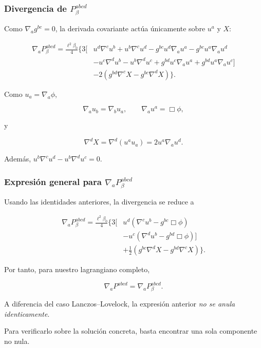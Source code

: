 \documentclass{beamer}
\begin{document}
\begin{frame}[label=nav-frame-117]
	\frametitle{Divergencia de $P_\beta^{abcd}$}
	\small

	Como \(\nabla_a g^{bc}=0\), la derivada covariante actúa únicamente
	sobre \(u^a\) y \(X\):

	\begin{align*}
		\nabla_aP_\beta^{abcd}
		=
		\frac{\ell^2\beta_0}{4}
		\Bigg\{
		3\Big[
		&
		u^d\nabla^c u^b
		+u^b\nabla^c u^d
		-g^{bc}u^d\nabla_a u^a
		-g^{bc}u^a\nabla_a u^d
		\\
		&
		-u^c\nabla^d u^b
		-u^b\nabla^d u^c
		+g^{bd}u^c\nabla_a u^a
		+g^{bd}u^a\nabla_a u^c
		\Big]
		\\
		&
		-2
		\left(
		g^{bd}\nabla^c X
		-
		g^{bc}\nabla^d X
		\right)
		\Bigg\}.
	\end{align*}

	Como \(u_a=\nabla_a\phi\),

	\[
	\nabla_a u_b=\nabla_b u_a,
	\qquad
	\nabla_a u^a=\Box\phi,
	\]

	y

	\[
	\nabla^dX
	=
	\nabla^d(u^a u_a)
	=
	2u^a\nabla_a u^d.
	\]

	Además,
	$u^b\nabla^c u^d-u^b\nabla^d u^c=0$.

\end{frame}


\begin{frame}[label=nav-frame-118]
	\frametitle{Expresión general para $\nabla_aP_\beta^{abcd}$}
	\small

	Usando las identidades anteriores, la divergencia se reduce a

	\[
	\boxed{
		\begin{aligned}
			\nabla_aP_\beta^{abcd}
			=
			\frac{\ell^2\beta_0}{4}
			\Bigg\{
			3\Big[
			&
			u^d
			\left(
			\nabla^c u^b-g^{bc}\Box\phi
			\right)
			\\
			&
			-u^c
			\left(
			\nabla^d u^b-g^{bd}\Box\phi
			\right)
			\Big]
			\\
			&
			+\frac12
			\left(
			g^{bc}\nabla^dX
			-
			g^{bd}\nabla^cX
			\right)
			\Bigg\}.
		\end{aligned}
	}
	\]

	Por tanto, para nuestro lagrangiano completo,

	\[
	\boxed{
		\nabla_aP^{abcd}
		=
		\nabla_aP_\beta^{abcd}
	}.
	\]

	A diferencia del caso Lanczos--Lovelock, la expresión anterior
	\emph{no se anula identicamente}.

	Para verificarlo sobre la solución concreta, basta encontrar una
	sola componente no nula.

\end{frame}
\end{document}
